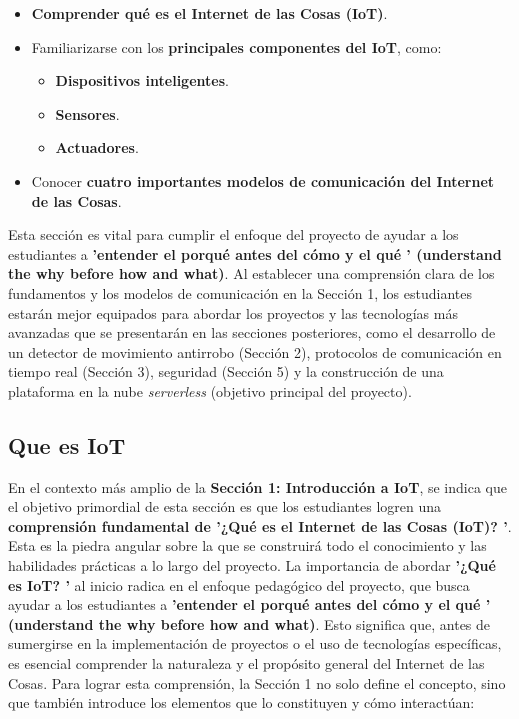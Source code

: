 \documentclass{report}
\begin{document}
\begin{itemize}
    \item \textbf{Comprender qué es el Internet de las Cosas (IoT)}.
    \item Familiarizarse con los \textbf{principales componentes del IoT}, como:
    \begin{itemize}
        \item \textbf{Dispositivos inteligentes}.
        \item \textbf{Sensores}.
        \item \textbf{Actuadores}.
    \end{itemize}
    \item Conocer \textbf{cuatro importantes modelos de comunicación del Internet de las Cosas}.
\end{itemize}
Esta sección es vital para cumplir el enfoque del proyecto de ayudar a los estudiantes a \textbf{ 'entender el porqué antes del cómo y el qué ' 
(understand the why before how and what)}. Al establecer una comprensión clara de los fundamentos y los modelos de comunicación en la Sección 1, 
los estudiantes estarán mejor equipados para abordar los proyectos y las tecnologías más avanzadas que se presentarán en las secciones posteriores, como 
el desarrollo de un detector de movimiento antirrobo (Sección 2), protocolos de comunicación en tiempo real (Sección 3), seguridad (Sección 5) y la 
construcción de una plataforma en la nube \textit{serverless} (objetivo principal del proyecto).

\subsection{Que es IoT}
En el contexto más amplio de la \textbf{Sección 1: Introducción a IoT}, se  indica que el objetivo primordial de esta sección es que los 
estudiantes logren una \textbf{comprensión fundamental de  '¿Qué es el Internet de las Cosas (IoT)? '}. Esta es la piedra angular sobre la que se construirá 
todo el conocimiento y las habilidades prácticas a lo largo del proyecto. La importancia de abordar \textbf{ '¿Qué es IoT? '} al inicio radica en el enfoque 
pedagógico del proyecto, que busca ayudar a los estudiantes a \textbf{ 'entender el porqué antes del cómo y el qué ' (understand the why before how and what)}. 
Esto significa que, antes de sumergirse en la implementación de proyectos o el uso de tecnologías específicas, es esencial comprender la naturaleza y el 
propósito general del Internet de las Cosas. Para lograr esta comprensión, la Sección 1 no solo define el concepto, sino que también introduce los elementos 
que lo constituyen y cómo interactúan:
\end{document}
